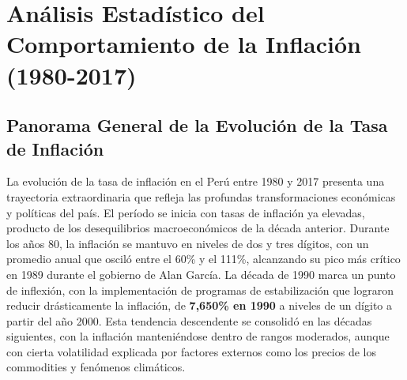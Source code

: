 \documentclass[
  stu,
  floatsintext,
  longtable,
  a4paper,
  nolmodern,
  notxfonts,
  notimes,
  12pt,
  colorlinks=true,linkcolor=blue,citecolor=blue,urlcolor=blue]{apa7}
\begin{document}
\section{Análisis Estadístico del Comportamiento de la Inflación
(1980-2017)}\label{anuxe1lisis-estaduxedstico-del-comportamiento-de-la-inflaciuxf3n-1980-2017}

\subsection{Panorama General de la Evolución de la Tasa de
Inflación}\label{panorama-general-de-la-evoluciuxf3n-de-la-tasa-de-inflaciuxf3n}

La evolución de la tasa de inflación en el Perú entre 1980 y 2017
presenta una trayectoria extraordinaria que refleja las profundas
transformaciones económicas y políticas del país. El período se inicia
con tasas de inflación ya elevadas, producto de los desequilibrios
macroeconómicos de la década anterior. Durante los años 80, la inflación
se mantuvo en niveles de dos y tres dígitos, con un promedio anual que
osciló entre el 60\% y el 111\%, alcanzando su pico más crítico en 1989
durante el gobierno de Alan García. La década de 1990 marca un punto de
inflexión, con la implementación de programas de estabilización que
lograron reducir drásticamente la inflación, de \textbf{7,650\% en 1990}
a niveles de un dígito a partir del año 2000. Esta tendencia descendente
se consolidó en las décadas siguientes, con la inflación manteniéndose
dentro de rangos moderados, aunque con cierta volatilidad explicada por
factores externos como los precios de los commodities y fenómenos
climáticos.
\end{document}
